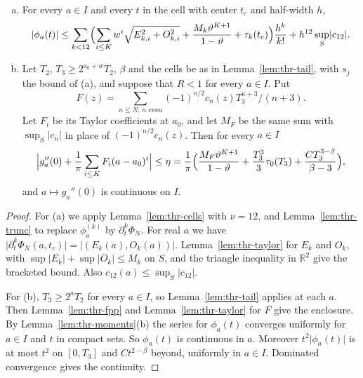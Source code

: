 \begin{proposition}\label{prop:thr-interval}
\begin{enumerate}[(a)]
\item For every $a\in I$ and every $t$ in the cell with center $t_c$ and
half-width $h$,
\[
 \lvert\phi_a(t)\rvert\le\sum_{k<12}\Bigl(\sum_{i\le K}w^i
 \sqrt{E_{k,i}^2+O_{k,i}^2}+\frac{M_k\vartheta^{K+1}}{1-\vartheta}+\tau_k(t_c)\Bigr)
 \frac{h^k}{k!}+h^{12}\sup_S\lvert c_{12}\rvert .
\]
\item Let $T_2$, $T_3\ge2^{a_0+w}T_2$, $\beta$ and the cells be as in
Lemma~\ref{lem:thr-tail}, with $s_j$ the bound of (a), and suppose that $R<1$
for every $a\in I$. Put
\[
 F(z)=\sum_{n\le N,\,n\text{ even}}(-1)^{n/2}c_n(z)T_3^{n+3}/(n+3).
\]
Let $F_i$ be its Taylor coefficients at $a_0$, and let $M_F$ be
the same sum with $\sup_S\lvert c_n\rvert$ in place of $(-1)^{n/2}c_n(z)$. Then
for every $a\in I$
\[
 \Bigl\lvert g_a''(0)+\frac1\pi\sum_{i\le K}F_i(a-a_0)^i\Bigr\rvert\le\eta
 =\frac1\pi\Bigl(\frac{M_F\vartheta^{K+1}}{1-\vartheta}+\frac{T_3^3}3\tau_0(T_3)
 +\frac{CT_3^{3-\beta}}{\beta-3}\Bigr),
\]
and $a\mapsto g_a''(0)$ is continuous on $I$.
\end{enumerate}
\end{proposition}

\begin{proof}
For (a) we apply Lemma~\ref{lem:thr-cells} with $\nu=12$, and
Lemma~\ref{lem:thr-trunc} to replace $\phi_a^{(k)}$ by $\partial_t^k\Phi_N$.
For real $a$ we have
$\lvert\partial_t^k\Phi_N(a,t_c)\rvert=\lvert(E_k(a),O_k(a))\rvert$.
Lemma~\ref{lem:thr-taylor} for $E_k$ and $O_k$, with
$\sup\lvert E_k\rvert+\sup\lvert O_k\rvert\le M_k$ on $S$, and the triangle
inequality in $\mathbb R^2$ give the bracketed bound. Also
$c_{12}(a)\le\sup_S\lvert c_{12}\rvert$.

For (b), $T_3\ge2^aT_2$ for every $a\in I$, so Lemma~\ref{lem:thr-tail} applies
at each $a$. Then Lemma~\ref{lem:thr-fpp} and Lemma~\ref{lem:thr-taylor} for
$F$ give the enclosure. By Lemma~\ref{lem:thr-moments}(b) the series for
$\phi_a(t)$ converges uniformly for $a\in I$ and $t$ in compact sets. So
$\phi_a(t)$ is continuous in $a$. Moreover $t^2\lvert\phi_a(t)\rvert$ is at
most $t^2$ on $[0,T_3]$ and $Ct^{2-\beta}$ beyond, uniformly in $a\in I$.
Dominated convergence gives the continuity.
\end{proof}


